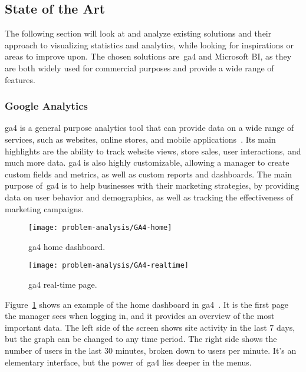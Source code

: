 \subsection{State of the Art}\label{subsec:state-of-the-art}

The following section will look at and analyze existing solutions and their approach to visualizing statistics and
analytics, while looking for inspirations or areas to improve upon.
The chosen solutions are~\acrlong{ga4} and Microsoft BI, as they are both widely used for commercial purposes and
provide a wide range of features.

\subsubsection{Google Analytics}\label{subsubsec:google-analytics}

\acrfull{ga4} is a general purpose analytics tool that can provide data on a wide range of services, such as websites,
online stores, and mobile applications~\cite{ga4}.
Its main highlights are the ability to track website views, store sales, user interactions, and much more data.
\acrshort{ga4} is also highly customizable, allowing a manager to create custom fields and metrics, as well as custom
reports and dashboards.
The main purpose of~\acrshort{ga4} is to help businesses with their marketing strategies, by providing data on user
behavior and demographics, as well as tracking the effectiveness of marketing campaigns.

\begin{figure}[H]
    \centering
    \texttt{[image: problem-analysis/GA4-home]}
    \caption{\acrshort{ga4} home dashboard.
    }\label{fig:GA4-dashboard}
\end{figure}

\begin{figure}[H]
    \centering
    \texttt{[image: problem-analysis/GA4-realtime]}
    \caption{\acrshort{ga4} real-time page.
    }\label{fig:GA4-realtime}
\end{figure}

Figure~\ref{fig:GA4-dashboard} shows an example of the home dashboard in \acrshort{ga4}~\cite{ga4-interface}.
It is the first page the manager sees when logging in, and it provides an overview of the most important data.
The left side of the screen shows site activity in the last 7 days, but the graph can be changed to any time period.
The right side shows the number of users in the last 30 minutes, broken down to users per minute.
It's an elementary interface, but the power of~\acrshort{ga4} lies deeper in the menus.

